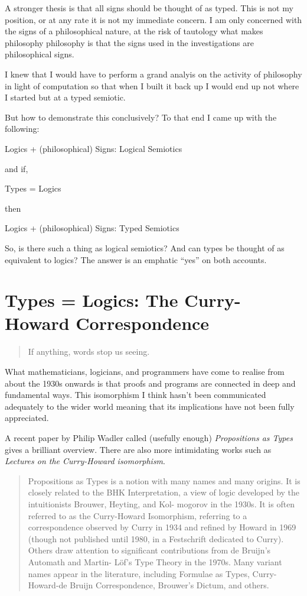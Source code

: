 \documentclass[dah,phd,a4paper]{xe_uccthesis}
\newcommand{\work}[1] {\textit{#1}}
\begin{document}
A stronger thesis is that all signs should be thought of as typed. This is not my position, or at any rate it is not my immediate concern. I am only concerned with the signs of a philosophical nature, at the risk of tautology what makes philosophy philosophy is that the signs used in the investigations are philosophical signs.

I knew that I would have to perform a grand analyis on the activity of philosophy in light of computation so that when I built it back up I would end up not where I started but at a typed semiotic.

But how to demonstrate this conclusively? To that end I came up with the following:

Logics + (philosophical) Signs: Logical Semiotics

and if,

Types = Logics

then

Logics + (philosophical) Signs: Typed Semiotics

So, is there such a thing as logical semiotics? And can types be thought of as equivalent to logics? The answer is an emphatic “yes” on both accounts.

\section{Types = Logics: The Curry-Howard Correspondence}

\begin{quotation}
If anything, words stop us seeing.
\end{quotation}

What mathematicians, logicians, and programmers have come to realise from about the 1930s onwards is that proofs and programs are connected in deep and fundamental ways. This isomorphism I think hasn't been communicated adequately to the wider world meaning that its implications have not been fully appreciated.

A recent paper by Philip Wadler called (usefully enough) \work{Propositions as Types}\citep{wadler_propositions_2014} gives a brilliant overview. There are also more intimidating works such as \work{Lectures on the Curry-Howard isomorphism}\citep{sorensen_lectures_2007}.

\begin{quotation}
Propositions as Types is a notion with many names and many
origins. It is closely related to the BHK Interpretation, a view of
logic developed by the intuitionists Brouwer, Heyting, and Kol-
mogorov in the 1930s. It is often referred to as the Curry-Howard
Isomorphism, referring to a correspondence observed by Curry in
1934 and refined by Howard in 1969 (though not published until
1980, in a Festschrift dedicated to Curry). Others draw attention
to significant contributions from de Bruijn’s Automath and Martin-
Löf’s Type Theory in the 1970s. Many variant names appear in the
literature, including Formulae as Types, Curry-Howard-de Bruijn
Correspondence, Brouwer’s Dictum, and others.
\begin{flushright}
\citep{wadler_propositions_2014}
\end{flushright}
\end{quotation}
\end{document}
